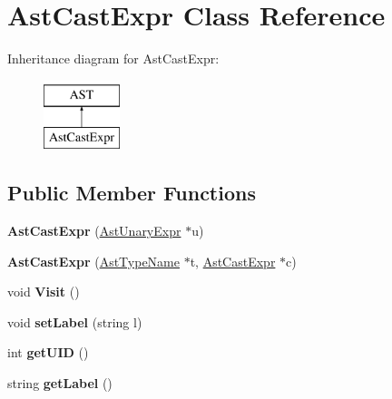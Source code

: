\hypertarget{classAstCastExpr}{\section{Ast\-Cast\-Expr Class Reference}
\label{classAstCastExpr}
}
Inheritance diagram for Ast\-Cast\-Expr\-:\begin{figure}[H]
\begin{center}
\leavevmode
\includegraphics[height=2.000000cm]{classAstCastExpr}
\end{center}
\end{figure}
\subsection*{Public Member Functions}
\begin{DoxyCompactItemize}
\item 
\hypertarget{classAstCastExpr_a27857eebb48c3a153ddd4bebb0a5bc31}{{\bfseries Ast\-Cast\-Expr} (\hyperlink{classAstUnaryExpr}{Ast\-Unary\-Expr} $\ast$u)}\label{classAstCastExpr_a27857eebb48c3a153ddd4bebb0a5bc31}

\item 
\hypertarget{classAstCastExpr_a7a4384301ff0feb3c56fc6456792c416}{{\bfseries Ast\-Cast\-Expr} (\hyperlink{classAstTypeName}{Ast\-Type\-Name} $\ast$t, \hyperlink{classAstCastExpr}{Ast\-Cast\-Expr} $\ast$c)}\label{classAstCastExpr_a7a4384301ff0feb3c56fc6456792c416}

\item 
\hypertarget{classAstCastExpr_a5c0f13da0e4bd315eb0e56c9cc9635e9}{void {\bfseries Visit} ()}\label{classAstCastExpr_a5c0f13da0e4bd315eb0e56c9cc9635e9}

\item 
\hypertarget{classAST_a71d680856e95ff89f55d5311a552eba6}{void {\bfseries set\-Label} (string l)}\label{classAST_a71d680856e95ff89f55d5311a552eba6}

\item 
\hypertarget{classAST_ab7a5b1d9f1c2de0d98deb356f724a42c}{int {\bfseries get\-U\-I\-D} ()}\label{classAST_ab7a5b1d9f1c2de0d98deb356f724a42c}

\item 
\hypertarget{classAST_aee029be902fffc927d16ccb03eb922ad}{string {\bfseries get\-Label} ()}\label{classAST_aee029be902fffc927d16ccb03eb922ad}

\end{DoxyCompactItemize}
